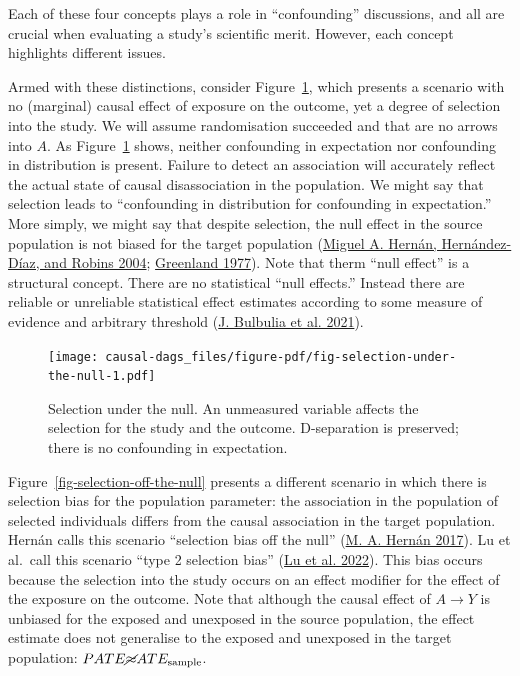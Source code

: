 \documentclass[
  singlecolumn]{article}
\begin{document}
Each of these four concepts plays a role in ``confounding'' discussions,
and all are crucial when evaluating a study's scientific merit. However,
each concept highlights different issues.

Armed with these distinctions, consider
Figure~\ref{fig-selection-under-the-null}, which presents a scenario
with no (marginal) causal effect of exposure on the outcome, yet a
degree of selection into the study. We will assume randomisation
succeeded and that are no arrows into \(A\). As
Figure~\ref{fig-selection-under-the-null} shows, neither confounding in
expectation nor confounding in distribution is present. Failure to
detect an association will accurately reflect the actual state of causal
disassociation in the population. We might say that selection leads to
``confounding in distribution for confounding in expectation.'' More
simply, we might say that despite selection, the null effect in the
source population is not biased for the target population
(\protect\hyperlink{ref-hernuxe1n2004}{Miguel A. Hernán, Hernández-Díaz,
and Robins 2004}; \protect\hyperlink{ref-greenland1977}{Greenland
1977}). Note that therm ``null effect'' is a structural concept. There
are no statistical ``null effects.'' Instead there are reliable or
unreliable statistical effect estimates according to some measure of
evidence and arbitrary threshold
(\protect\hyperlink{ref-bulbulia2021}{J. Bulbulia et al. 2021}).

\begin{figure}

{\centering \texttt{[image: causal-dags\_files/figure-pdf/fig-selection-under-the-null-1.pdf]}

}

\caption{\label{fig-selection-under-the-null}Selection under the null.
An unmeasured variable affects the selection for the study and the
outcome. D-separation is preserved; there is no confounding in
expectation.}

\end{figure}

Figure~\ref{fig-selection-off-the-null} presents a different scenario in
which there is selection bias for the population parameter: the
association in the population of selected individuals differs from the
causal association in the target population. Hernán calls this scenario
``selection bias off the null''
(\protect\hyperlink{ref-hernuxe1n2017}{M. A. Hernán 2017}). Lu et
al.~call this scenario ``type 2 selection bias''
(\protect\hyperlink{ref-lu2022}{Lu et al. 2022}). This bias occurs
because the selection into the study occurs on an effect modifier for
the effect of the exposure on the outcome. Note that although the causal
effect of \(A\to Y\) is unbiased for the exposed and unexposed in the
source population, the effect estimate does not generalise to the
exposed and unexposed in the target population:
\(PATE \cancel{\approx} ATE_{\text{sample}}\).
\end{document}
